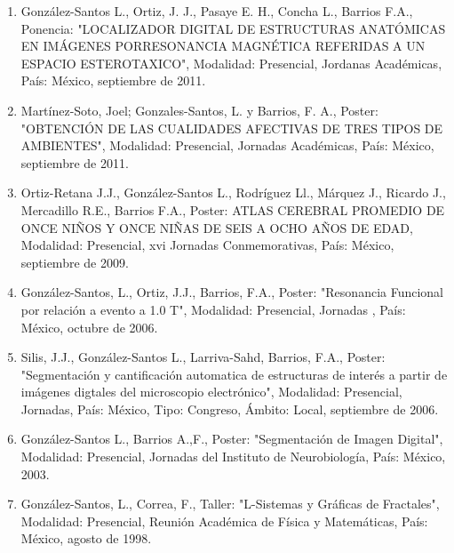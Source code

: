 \begin{enumerate}
\item  González-Santos L., Ortiz, J. J., Pasaye E. H., Concha L., Barrios F.A., Ponencia: "LOCALIZADOR DIGITAL DE ESTRUCTURAS 
ANATÓMICAS EN IMÁGENES PORRESONANCIA MAGNÉTICA REFERIDAS A UN ESPACIO ESTEROTAXICO", Modalidad: Presencial, Jordanas 
Académicas, País: México, septiembre de 2011.

\item  Martínez-Soto, Joel; Gonzales-Santos, L. y Barrios, F. A., Poster: "OBTENCIÓN DE LAS CUALIDADES AFECTIVAS DE TRES TIPOS 
DE AMBIENTES", Modalidad: Presencial, Jornadas Académicas, País: México, septiembre de 2011.

\item  Ortiz-Retana J.J., González-Santos L., Rodríguez Ll., Márquez J., Ricardo J., Mercadillo R.E., Barrios F.A., Poster: 
ATLAS CEREBRAL PROMEDIO DE ONCE NIÑOS Y ONCE NIÑAS DE SEIS A OCHO AÑOS DE EDAD, Modalidad: Presencial, xvi Jornadas 
Conmemorativas, País: México, septiembre de 2009.

\item  González-Santos, L., Ortiz, J.J., Barrios, F.A., Poster: "Resonancia Funcional por relación a evento a 1.0 T", 
Modalidad: Presencial, Jornadas , País: México, octubre de 2006.

\item  Silis, J.J., González-Santos L., Larriva-Sahd, Barrios, F.A., Poster: "Segmentación y cantificación automatica de 
estructuras de interés a partir de imágenes digtales del microscopio electrónico", Modalidad: Presencial, Jornadas, País: 
México, Tipo: Congreso, Ámbito: Local, septiembre de 2006.

\item  González-Santos L., Barrios A.,F., Poster: "Segmentación de Imagen Digital", Modalidad: Presencial, Jornadas del 
Instituto de Neurobiología, País: México, 2003.

\item  González-Santos, L., Correa, F., Taller: "L-Sistemas y Gráficas de Fractales", Modalidad: Presencial, Reunión Académica 
de Física y Matemáticas, País: México, agosto de 1998.

\end{enumerate}



